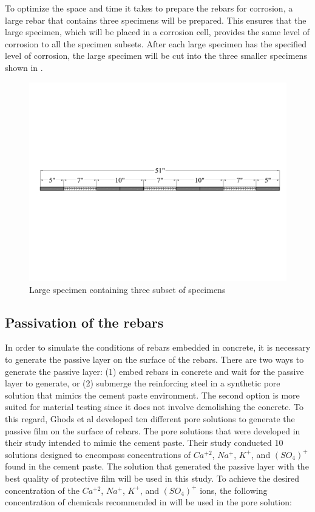 To optimize the space and time it takes to prepare the rebars for corrosion, a large rebar that contains three specimens will be prepared. This ensures that the large specimen, which will be placed in a corrosion cell, provides the same level of corrosion to all the specimen subsets. After each large specimen has the specified level of corrosion, the large specimen will be cut into the three smaller specimens shown in .

\begin{figure}[htbp]
	\centering
	\includegraphics[width=1.0\textwidth]{Chapter-3/figs/LargeSpecimen}
	\caption{Large specimen containing three subset of specimens}
	\label{fig:LargeSpecimen}
\end{figure}

\newpage

\subsection{Passivation of the rebars}

In order to simulate the conditions of rebars embedded in concrete, it is necessary to generate the passive layer on the surface of the rebars. There are two ways to generate the passive layer: (1) embed rebars in concrete and wait for the passive layer to generate, or (2) submerge the reinforcing steel in a synthetic pore solution that mimics the cement paste environment. The second option is more suited for material testing since it does not involve demolishing the concrete. To this regard, Ghods et al \cite{Ghods2010} developed ten different pore solutions to generate the passive film on the surface of rebars. The pore solutions that were developed in their study intended to mimic the cement paste. Their study conducted 10 solutions designed to encompass concentrations of $Ca^{+2}$, $Na^{+}$, $K^{+}$, and $(SO_{4})^{+}$ found in the cement paste. The solution that generated the passive layer with the best quality of protective film will be used in this study. To achieve the desired concentration of the $Ca^{+2}$, $Na^{+}$, $K^{+}$, and $(SO_{4})^{+}$ ions, the following concentration of chemicals recommended in \cite{Ghods2010} will be used in the pore solution:

